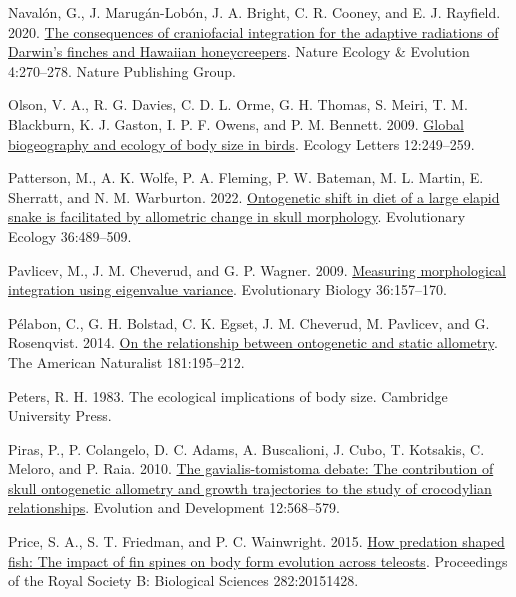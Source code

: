 \documentclass[
  11pt,
]{article}
\newlength{\cslhangindent}
\newlength{\cslentryspacingunit} %
\newenvironment{CSLReferences}[2] %
 {%
  \setlength{\parindent}{0pt}
  \ifodd #1
  \let\oldpar\par
  \def\par{\hangindent=\cslhangindent\oldpar}
  \fi
  \setlength{\parskip}{#2\cslentryspacingunit}
 }%
 {}
\begin{document}
\begin{CSLReferences}{1}{0}
\leavevmode{}%
Navalón, G., J. Marugán-Lobón, J. A. Bright, C. R. Cooney, and E. J.
Rayfield. 2020. \href{https://doi.org/10.1038/s41559-019-1092-y}{The
consequences of craniofacial integration for the adaptive radiations of
{D}arwin's finches and {H}awaiian honeycreepers}. Nature Ecology \&
Evolution 4:270--278. Nature Publishing Group.

\leavevmode{}%
Olson, V. A., R. G. Davies, C. D. L. Orme, G. H. Thomas, S. Meiri, T. M.
Blackburn, K. J. Gaston, I. P. F. Owens, and P. M. Bennett. 2009.
\href{https://doi.org/10.1111/j.1461-0248.2009.01281.x}{Global
biogeography and ecology of body size in birds}. Ecology Letters
12:249--259.

\leavevmode{}%
Patterson, M., A. K. Wolfe, P. A. Fleming, P. W. Bateman, M. L. Martin,
E. Sherratt, and N. M. Warburton. 2022.
\href{https://doi.org/10.1007/s10682-022-10164-x}{Ontogenetic shift in
diet of a large elapid snake is facilitated by allometric change in
skull morphology}. Evolutionary Ecology 36:489--509.

\leavevmode{}%
Pavlicev, M., J. M. Cheverud, and G. P. Wagner. 2009.
\href{https://doi.org/10.1007/s11692-008-9042-7}{Measuring morphological
integration using eigenvalue variance}. Evolutionary Biology
36:157--170.

\leavevmode{}%
Pélabon, C., G. H. Bolstad, C. K. Egset, J. M. Cheverud, M. Pavlicev,
and G. Rosenqvist. 2014. \href{https://doi.org/10.1086/668820}{On the
relationship between ontogenetic and static allometry}. The American
Naturalist 181:195--212.

\leavevmode{}%
Peters, R. H. 1983. The ecological implications of body size. Cambridge
University Press.

\leavevmode{}%
Piras, P., P. Colangelo, D. C. Adams, A. Buscalioni, J. Cubo, T.
Kotsakis, C. Meloro, and P. Raia. 2010.
\href{https://doi.org/10.1111/j.1525-142x.2010.00442.x}{The
gavialis-tomistoma debate: The contribution of skull ontogenetic
allometry and growth trajectories to the study of crocodylian
relationships}. Evolution and Development 12:568--579.

\leavevmode{}%
Price, S. A., S. T. Friedman, and P. C. Wainwright. 2015.
\href{https://doi.org/10.1098/rspb.2015.1428}{How predation shaped fish:
The impact of fin spines on body form evolution across teleosts}.
Proceedings of the Royal Society B: Biological Sciences 282:20151428.


\end{CSLReferences}
\end{document}
